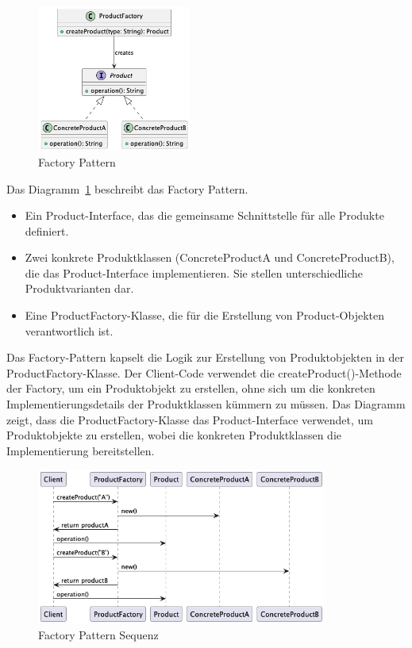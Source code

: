 \begin{figure}[!ht]
  \centering
  \includegraphics[width=0.45\textwidth]{fig/uml/factory-class.png}
  \caption{Factory Pattern}
  \label{fig:factory-class}
\end{figure}
Das Diagramm~\ref{fig:factory-class} beschreibt das Factory Pattern.
\begin{itemize}
\item Ein Product-Interface, das die gemeinsame Schnittstelle für alle Produkte definiert.
\item Zwei konkrete Produktklassen (ConcreteProductA und ConcreteProductB), die das Product-Interface implementieren. Sie stellen unterschiedliche Produktvarianten dar.
\item Eine ProductFactory-Klasse, die für die Erstellung von Product-Objekten verantwortlich ist.
\end{itemize}
Das Factory-Pattern kapselt die Logik zur Erstellung von Produktobjekten in der ProductFactory-Klasse. Der Client-Code verwendet die createProduct()-Methode der Factory, um ein Produktobjekt zu erstellen, ohne sich um die konkreten Implementierungsdetails der Produktklassen kümmern zu müssen. Das Diagramm zeigt, dass die ProductFactory-Klasse das Product-Interface verwendet, um Produktobjekte zu erstellen, wobei die konkreten Produktklassen die Implementierung bereitstellen.

\begin{figure}[!ht]
  \centering
  \includegraphics[width=0.85\textwidth]{fig/uml/factory-seq.png}
  \caption{Factory Pattern Sequenz}
  \label{fig:factory-seq}
\end{figure}

